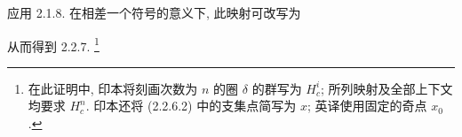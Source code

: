 应用 2.1.8. 在相差一个符号的意义下, 此映射可改写为
\begin{center}
\end{center}
从而得到 2.2.7.
\footnote{在此证明中, 印本将刻画次数为 $n$ 的圈 $\delta$ 的群写为 $H_c^i$; 所列映射及全部上下文均要求 $H_c^n$. 印本还将 (2.2.6.2) 中的支集点简写为 $x$; 英译使用固定的奇点 $x_0$.}